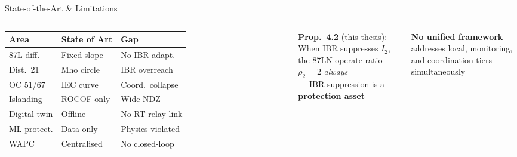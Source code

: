 \documentclass[aspectratio=169, 10pt]{beamer}
\begin{document}
\begin{frame}{State-of-the-Art \& Limitations}
\begin{columns}[T]
      \vspace{0.2cm}
      \scriptsize
      \begin{tabular}{@{}llp{2.2cm}@{}}
        \toprule
        \textbf{Area} & \textbf{State of Art} & \textbf{Gap} \\
        \midrule
        87L diff.    & Fixed slope  & No IBR adapt. \\
        \rowcolor{lightblue!40}
        Dist.\ 21    & Mho circle   & IBR overreach \\
        OC 51/67     & IEC curve    & Coord.\ collapse \\
        \rowcolor{lightblue!40}
        Islanding    & ROCOF only   & Wide NDZ \\
        Digital twin & Offline      & No RT relay link \\
        \rowcolor{lightblue!40}
        ML protect.  & Data-only    & Physics violated \\
        WAPC         & Centralised  & No closed-loop \\
        \bottomrule
      \end{tabular}
      \vspace{0.3cm}
      \begin{tcolorbox}[keyfact, title=Key Insight from Literature Gap]
        \scriptsize
        \textbf{Prop.\ 4.2} (this thesis): When IBR suppresses $I_2$,\\
        the 87LN operate ratio $\rho_2 = 2$ \emph{always}\\
        --- IBR suppression is a \textbf{protection asset}
      \end{tcolorbox}
      \vspace{0.2cm}
      \begin{tcolorbox}[alert2]
        \scriptsize
        \textbf{No unified framework} addresses local, monitoring,\\
        and coordination tiers simultaneously
      \end{tcolorbox}
  \end{columns}


\end{frame}
\end{document}
